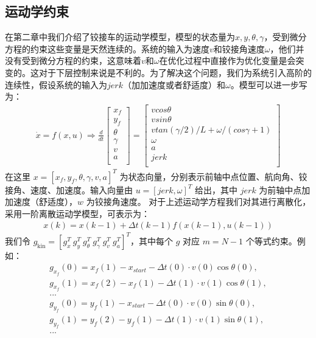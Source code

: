 \documentclass[master,academic]{ysuthesis} %
\begin{document}
		\subsection{运动学约束}
		在第二章中我们介绍了铰接车的运动学模型，模型的状态量为$x,y,\theta,\gamma$，受到微分方程的约束这些变量是天然连续的。系统的输入为速度$v$和铰接角速度$\omega$，他们并没有受到微分方程的约束，这意味着$v$和$\omega$在优化过程中直接作为优化变量是会突变的。这对于下层控制来说是不利的。为了解决这个问题，我们为系统引入高阶的连续性，假设系统的输入为$jerk$（加加速度或者舒适度）和$\omega$。模型可以进一步写为：
		\begin{equation}
			\begin{aligned}
				\dot{x}=f( x,u ) \Longrightarrow \frac{d}{dt}\left[ \begin{array}{c}
					x_f\\
					y_f\\
					\theta\\
					\gamma\\
					v\\
					a\\
				\end{array} \right] =\left[ \begin{array}{c}
					vcos\theta\\
					vsin\theta\\
					vtan( \gamma /2 ) /L+\omega / (cos\gamma +1 )\\
					\omega\\
					a\\
					jerk\\
				\end{array} \right] 
			\end{aligned}   
		\end{equation}
		在这里 $x=\left[ x_f,y_f,\theta,\gamma,v,a \right]^T$ 为状态向量，分别表示前轴中点位置、航向角、铰接角、速度、加速度。输入向量由 $u=\left[jerk,\omega\right]^T$ 给出，其中 $jerk$ 为前轴中点加加速度（舒适度），$w$ 为铰接角速度。
		对于上述运动学方程我们对其进行离散化，采用一阶离散运动学模型，可表示为：
		\begin{equation}
			\begin{aligned}
				x( k ) =x( k-1 ) +\Delta t( k-1 ) f( x( k-1 ) ,u( k-1 ) ) 
			\end{aligned}   
		\end{equation}
		我们令 \(g_{\text{kin}} = [g_x^T\ g_y^T\ g_\theta^T\ g_\gamma^T\ g_v^T\ g_a^T]^T\)，其中每个 \(g\) 对应 \(m = N-1\) 个等式约束。例如：
		\begin{equation}
			\begin{aligned}
				g_{x_f}( 0 ) =x_f( 1 ) -x_{start}-\Delta t( 0 ) \cdot v( 0 ) \cos \theta( 0 ) ,\\
				g_{x_f}( 1 ) =x_f( 2 ) -x_f( 1 ) -\Delta t( 1 ) \cdot v( 1 ) \cos \theta ( 1 ) ,\\
				...\\
				g_{y_f}( 0 ) =y_f( 1 ) -x_{start}-\Delta t( 0 ) \cdot v( 0 ) \sin \theta ( 0 ) ,\\
				g_{y_f}( 1 ) =y_f( 2 ) -y_f( 1 ) -\Delta t( 1 ) \cdot v( 1 ) \sin \theta ( 1 ) ,\\
				...
			\end{aligned}   
		\end{equation}
\end{document}
